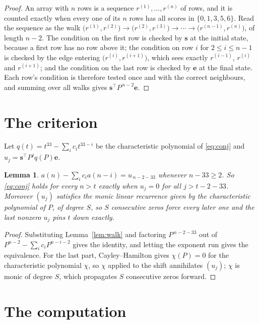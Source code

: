 \documentclass[11pt,a4paper]{article}
\theoremstyle{plain}
\newtheorem{lemma}[theorem]{Lemma}
\theoremstyle{definition}
\begin{document}
\begin{proof}
An array with $n$ rows is a sequence $r^{(1)},\dots,r^{(n)}$ of rows, and it is counted
exactly when every one of its $n$ rows has all scores in $\{0,1,3,5,6\}$. Read the sequence as the
walk $\bigl(r^{(1)},r^{(2)}\bigr)\to\bigl(r^{(2)},r^{(3)}\bigr)\to\cdots\to
\bigl(r^{(n-1)},r^{(n)}\bigr)$, of length $n-2$. The condition on the first row is
checked by $\mathbf{s}$ at the initial state, because a first row has no row above it; the
condition on row $i$ for $2\le i\le n-1$ is checked by the edge entering
$\bigl(r^{(i)},r^{(i+1)}\bigr)$, which sees exactly $r^{(i-1)}$, $r^{(i)}$ and
$r^{(i+1)}$; and the condition on the last row is checked by $\mathbf{e}$ at the final
state. Each row's condition is therefore tested once and with the correct neighbours, and
summing over all walks gives $\mathbf{s}^{\!\top}P^{\,n-2}\mathbf{e}$.
\end{proof}

\section{The criterion}

Let $q(t)=t^{33}-\sum_i c_i t^{33-i}$ be the characteristic polynomial of
\eqref{eq:conj} and $u_j=\mathbf{s}^{\!\top}P^{j}q(P)\mathbf{e}$.

\begin{lemma}\label{lem:crit}
$a(n)-\sum_i c_i a(n-i)=u_{\,n-2-33}$ whenever $n-33\ge2$. So \eqref{eq:conj}
holds for every $n>t$ exactly when $u_j=0$ for all $j>t-2-33$. Moreover $(u_j)$
satisfies the monic linear recurrence given by the characteristic polynomial of $P$, of
degree $S$, so $S$ consecutive zeros force every later one and the last nonzero $u_j$ pins
$t$ down exactly.
\end{lemma}

\begin{proof}
Substituting Lemma~\ref{lem:walk} and factoring $P^{\,n-2-33}$ out of
$P^{n-2}-\sum_i c_i P^{n-i-2}$ gives the identity, and letting the exponent run gives the
equivalence. For the last part, Cayley--Hamilton gives $\chi(P)=0$ for the characteristic
polynomial $\chi$, so $\chi$ applied to the shift annihilates $(u_j)$; $\chi$ is monic of
degree $S$, which propagates $S$ consecutive zeros forward.
\end{proof}

\section{The computation}
\end{document}
